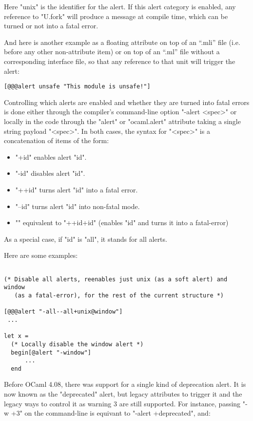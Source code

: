 {Here "unix" is the identifier for the alert.  If this alert category
is enabled, any reference to "U.fork" will produce a message at
compile time, which can be turned or not into a fatal error.

And here is another example as a floating attribute on top
of an ``.mli'' file (i.e. before any other non-attribute item)
or on top of an ``.ml'' file without a corresponding interface file,
so that any reference to that unit will trigger the alert:

\begin{verbatim}
[@@@alert unsafe "This module is unsafe!"]
\end{verbatim}


Controlling which alerts are enabled and whether they are turned into
fatal errors is done either through the compiler's command-line option
"-alert <spec>" or locally in the code through the "alert" or
"ocaml.alert" attribute taking a single string payload "<spec>".  In
both cases, the syntax for "<spec>" is a concatenation of items of the
form:

\begin{itemize}
\item "+id" enables alert "id".
\item "-id" disables alert "id".
\item "++id" turns alert "id" into a fatal error.
\item "--id" turns alert "id" into non-fatal mode.
\item "\@id" equivalent to "++id+id" (enables "id" and turns it into a fatal-error)
\end{itemize}

As a special case, if "id" is "all", it stands for all alerts.

Here are some examples:

\begin{verbatim}

(* Disable all alerts, reenables just unix (as a soft alert) and window
   (as a fatal-error), for the rest of the current structure *)

[@@@alert "-all--all+unix@window"]
 ...

let x =
  (* Locally disable the window alert *)
  begin[@alert "-window"]
      ...
  end
\end{verbatim}

Before OCaml 4.08, there was support for a single kind of deprecation
alert.  It is now known as the "deprecated" alert, but legacy
attributes to trigger it and the legacy ways to control it as warning
3 are still supported. For instance, passing "-w +3" on the
command-line is equivant to "-alert +deprecated", and:

}
